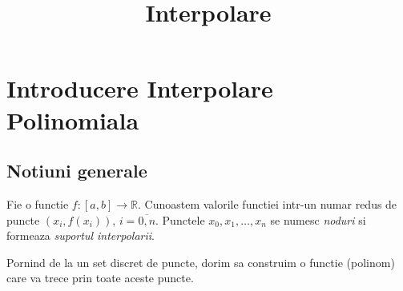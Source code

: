 \documentclass{article}
\title{Interpolare}
\author{}
\date{}
\begin{document}
\maketitle

\section{Introducere Interpolare Polinomiala}

\subsection{Notiuni generale}
\tab Fie o functie $f:[a,b]\rightarrow\mathbb{R}.$
Cunoastem valorile functiei intr-un numar redus de puncte $(x_i, f(x_i)), \, i = \overline{0, n}$.
Punctele $x_0, x_1,\dots, x_n$ se numesc \textit{noduri} si formeaza \textit{suportul interpolarii}.

Pornind de la un set discret de puncte, dorim sa construim o functie (polinom) care va trece prin toate aceste puncte.
\end{document}
